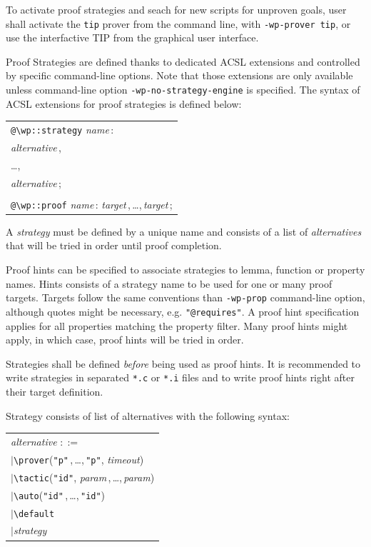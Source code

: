 To activate proof strategies and seach for new scripts for unproven goals, user
shall activate the \verb+tip+ prover from the command line, with
\verb+-wp-prover tip+, or use the interfactive \textsf{TIP} from the graphical
user interface.

Proof Strategies are defined thanks to dedicated ACSL extensions and controlled
by specific command-line options. Note that those extensions are only available
unless command-line option \verb+-wp-no-strategy-engine+ is specified.
The syntax of ACSL extensions for proof strategies is defined below:

\newcommand{\pdots}{\,,\,\ldots,\,}

\begin{center}
  \begin{tabular}{l}
    \verb+@\wp::strategy+ \textit{name}\,: \\
    \quad\quad\textit{alternative}\,, \\
    \quad\quad\ldots, \\
    \quad\quad\textit{alternative}\,; \\
    \\
    \verb+@\wp::proof+ \textit{name}\,: \textit{target}\pdots\textit{target}\,;
  \end{tabular}
\end{center}

A \emph{strategy} must be defined by a unique name and consists of a list of
\emph{alternatives} that will be tried in order until proof completion.

Proof hints can be specified to associate strategies to lemma, function or
property names. Hints consists of a strategy name to be used for one or many
proof targets.  Targets follow the same conventions than \verb$-wp-prop$
command-line option, although quotes might be necessary,
e.g. \verb$"@requires"$.  A proof hint specification applies for all properties
matching the property filter.  Many proof hints might apply, in which
case, proof hints will be tried in order.

Strategies shall be defined \emph{before} being used as proof hints. It is
recommended to write strategies in separated \verb$*.c$ or \verb$*.i$ files and
to write proof hints right after their target definition.

Strategy consists of list of alternatives with the following syntax:

\begin{center}
  \begin{tabular}{l}
    \textit{alternative} $::=$ \\
    \quad$|$\quad\verb+\prover+(\verb+"p"+\pdots\verb+"p"+, \textit{timeout}) \\
    \quad$|$\quad\verb+\tactic+(\verb+"id"+, \textit{param}\pdots\textit{param}) \\
    \quad$|$\quad\verb+\auto+(\verb+"id"+\pdots\verb+"id"+) \\
    \quad$|$\quad\verb+\default+ \\
    \quad$|$\quad\textit{strategy}
  \end{tabular}
\end{center}

